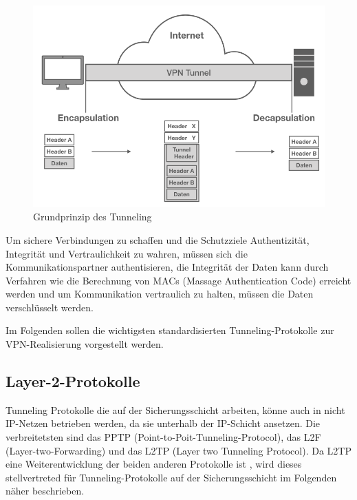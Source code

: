 \begin{figure}[h]
	\includegraphics[width=\linewidth]{tunneling}
	\caption{Grundprinzip des Tunneling}
	\label{tunnel}
\end{figure}

Um sichere Verbindungen zu schaffen und die Schutzziele Authentizität, Integrität und Vertraulichkeit zu wahren, müssen sich die Kommunikationspartner authentisieren, die Integrität der Daten kann durch Verfahren wie die Berechnung von MACs (Massage Authentication Code) erreicht werden und um Kommunikation vertraulich zu halten, müssen die Daten verschlüsselt werden.  

 Im Folgenden sollen die wichtigsten standardisierten  Tunneling-Protokolle zur VPN-Realisierung vorgestellt werden.
 

\subsection{Layer-2-Protokolle}
Tunneling Protokolle die auf der Sicherungsschicht arbeiten, könne auch in nicht IP-Netzen betrieben werden, da sie unterhalb der IP-Schicht ansetzen. Die verbreitetsten sind das PPTP (Point-to-Poit-Tunneling-Protocol), das L2F  (Layer-two-Forwarding) und das L2TP (Layer two Tunneling Protocol). Da L2TP eine Weiterentwicklung der beiden anderen Protokolle ist \cite{lipp2007vpn}, wird dieses stellvertreted für Tunneling-Protokolle auf der Sicherungsschicht im Folgenden näher beschrieben.



